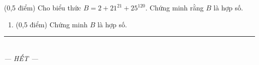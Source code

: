 \documentclass[12pt,a4paper]{article}
\begin{document}
\begin{ex} (0,5 điểm)
Cho biểu thức $B = 2 + 21^{21} + 25^{120}$. Chứng minh rằng $B$ là hợp số.
\begin{enumerate}[label=\textbf{\alph*)}, leftmargin=0.8cm, itemsep=2pt]
\item (0,5 điểm) Chứng minh $B$ là hợp số.
\end{enumerate}
\end{ex}
\vspace{1.5mm}


\begin{center}
\rule{4cm}{0.4pt}\\
\textit{--- HẾT ---}
\end{center}
\end{document}
